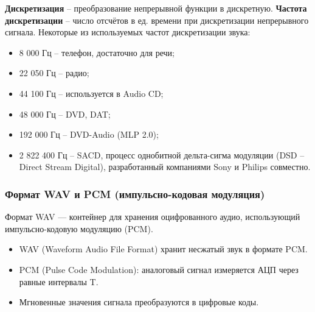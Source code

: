 	\textbf{Дискретизация} -- преобразование непрерывной функции в дискретную.
	\newline
	\textbf{Частота дискретизации} -- число отсчётов в ед. времени при дискретизации непрерывного сигнала.
	\newline
	Некоторые из используемых частот дискретизации звука: 
	\begin{itemize}
		\item 8 000 Гц -- телефон, достаточно для речи; 
		\item 22 050 Гц -- радио; 
		\item 44 100 Гц -- используется в Audio CD; 
		\item 48 000 Гц -- DVD, DAT; 
		\item 192 000 Гц -- DVD-Audio (MLP 2.0); 
		\item 2 822 400 Гц -- SACD, процесс однобитной дельта-сигма модуляции (DSD -- Direct Stream Digital), разработанный компаниями Sony и Philips совместно.
	\end{itemize}
	\vspace{-1.5em}
	\subsubsection{Формат WAV и PCM (импульсно-кодовая модуляция)}
	Формат WAV — контейнер для хранения оцифрованного аудио, использующий импульсно-кодовую модуляцию (PCM).
	\begin{itemize}
		\item WAV (Waveform Audio File Format) хранит несжатый звук в формате PCM.
		\item PCM (Pulse Code Modulation): аналоговый сигнал измеряется АЦП через равные интервалы T.
		\item Мгновенные значения сигнала преобразуются в цифровые коды.
	\end{itemize}
	\vspace{-1.5em}
